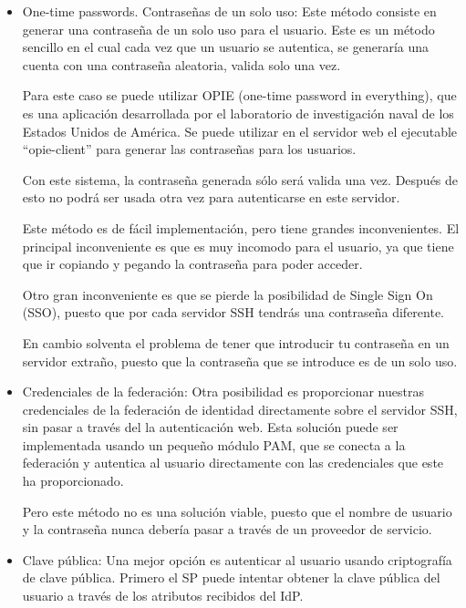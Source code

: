     \begin{itemize}
        
        \item{One-time passwords. Contraseñas de un solo uso:}
        Este método consiste en generar una contraseña de un solo uso
        para el usuario. Este es un método sencillo en el cual cada
        vez que un usuario se autentica, se generaría una cuenta con
        una contraseña aleatoria, valida solo una vez.

        Para este caso se puede utilizar OPIE (one-time password in
        everything), que es una aplicación desarrollada por el
        laboratorio de investigación naval de los Estados Unidos de
        América. Se puede utilizar en el servidor web el ejecutable
        ``opie-client'' para generar las contraseñas para los
        usuarios.

        Con este sistema, la contraseña generada sólo será valida una
        vez. Después de esto no podrá ser usada otra vez para
        autenticarse en este servidor.

        Este método es de fácil implementación, pero tiene grandes
        inconvenientes. El principal inconveniente es que es muy
        incomodo para el usuario, ya que tiene que ir copiando y
        pegando la contraseña para poder acceder.

        Otro gran inconveniente es que se pierde la posibilidad de
        Single Sign On (SSO), puesto que por cada servidor SSH tendrás
        una contraseña diferente.

        En cambio solventa el problema de tener que introducir tu
        contraseña en un servidor extraño, puesto que la contraseña
        que se introduce es de un solo uso.

        \item{Credenciales de la federación:} 
        Otra posibilidad es proporcionar nuestras credenciales de la
        federación de identidad directamente sobre el servidor SSH,
        sin pasar a través del la autenticación web. Esta solución
        puede ser implementada usando un pequeño módulo PAM, que se
        conecta a la federación y autentica al usuario directamente
        con las credenciales que este ha proporcionado.

        Pero este método no es una solución viable, puesto que el
        nombre de usuario y la contraseña nunca debería pasar a través
        de un proveedor de servicio.

        \item{Clave pública:}
        Una mejor opción es autenticar al usuario usando criptografía
        de clave pública. Primero el SP puede intentar obtener la
        clave pública del usuario a través de los atributos recibidos
        del IdP.
        

\end{itemize}

